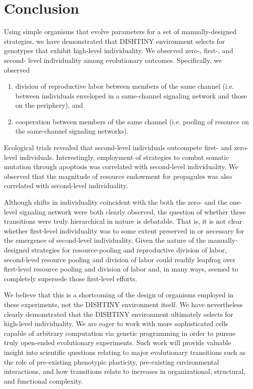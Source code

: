 \section{Conclusion}

Using simple organisms that evolve parameters for a set of manually-designed strategies, we have demonstrated that DISHTINY environment selects for genotypes that exhibit high-level individuality.
We observed zero-, first-, and second- level individuality among evolutionary outcomes.
Specifically, we observed
\begin{enumerate}
  \item division of reproductive labor between members of the same channel (i.e. between individuals enveloped in a same-channel signaling network and those on the periphery), and
  \item cooperation between members of the same channel (i.e. pooling of resource on the same-channel signaling networks).
\end{enumerate}

Ecological trials revealed that second-level individuals outcompete first- and zero-level individuals.
Interestingly, employment of strategies to combat somatic mutation through apoptosis was correlated with second-level individuality.
We observed that the magnitude of resource endowment for propagules was also correlated with second-level individuality.

Although shifts in individuality coincident with the both the zero- and the one-level signaling network were both clearly observed, the question of whether these transitions were truly hierarchical in nature is debatable.
That is, it is not clear whether first-level individuality was to some extent preserved in or necessary for the emergence of second-level individuality.
Given the nature of the manually-designed strategies for resource-pooling and reproductive division of labor, second-level resource pooling and division of labor could readily leapfrog over first-level resource pooling and division of labor and, in many ways, seemed to completely supersede those first-level efforts.

We believe that this is a shortcoming of the design of organisms employed in these experiments, not the DISHTINY environment itself.
We have nevertheless clearly demonstrated that the DISHTINY environment ultimately selects for high-level individuality.
We are eager to work with more sophisticated cells capable of arbitrary computation via genetic programming in order to pursue truly open-ended evolutionary experiments.
Such work will provide valuable insight into scientific questions relating to major evolutionary transitions such as the role of pre-existing phenotypic plasticity, pre-existing environmental interactions, and how transitions relate to increases in organizational, structural, and functional complexity.

